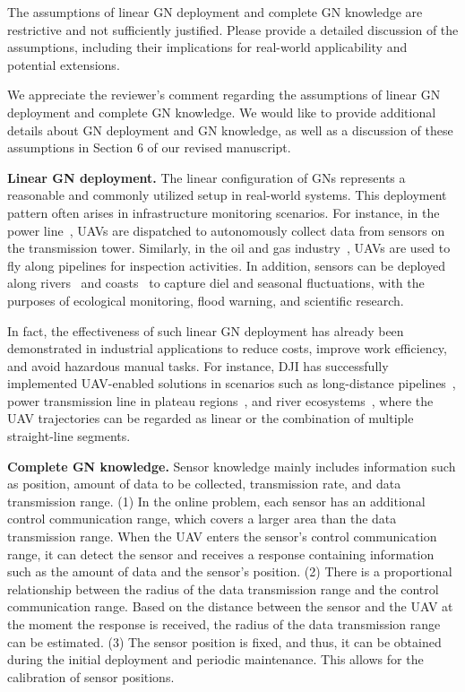 \begin{revcomment}
	The assumptions of linear GN deployment and complete GN knowledge are restrictive and not sufficiently justified. Please provide a detailed discussion of the assumptions, including their implications for real-world applicability and potential extensions.
\end{revcomment}
\begin{revresponse}
	We appreciate the reviewer's comment regarding the assumptions of linear GN deployment and complete GN knowledge.
	We would like to provide additional details about GN deployment and GN knowledge, as well as a discussion of these assumptions in Section 6 of our revised manuscript.

	\textbf{Linear GN deployment.}
	The linear configuration of GNs represents a reasonable and commonly utilized setup in real-world systems.
	This deployment pattern often arises in infrastructure monitoring scenarios.
	For instance, in the power line~\cite{powerline,transmission-line}, UAVs are dispatched to autonomously collect data from sensors on the transmission tower.
	Similarly, in the oil and gas industry~\cite{pipeline}, UAVs are used to fly along pipelines for inspection activities.
	In addition, sensors can be deployed along rivers~\cite{river} and coasts~\cite{coast} to capture diel and seasonal fluctuations, with the purposes of ecological monitoring, flood warning, and scientific research.

	In fact, the effectiveness of such linear GN deployment has already been demonstrated in industrial applications to reduce costs, improve work efficiency, and avoid hazardous manual tasks.
	For instance, DJI has successfully implemented UAV-enabled solutions in scenarios such as long-distance pipelines~\cite{DJI-pipeline}, power transmission line in plateau regions~\cite{DJI-powerline}, and river ecosystems~\cite{DJI-river}, where the UAV trajectories can be regarded as linear or the combination of multiple straight-line segments.

	\textbf{Complete GN knowledge.}
	Sensor knowledge mainly includes information such as position, amount of data to be collected, transmission rate, and data transmission range.
	(1) In the online problem, each sensor has an additional control communication range, which covers a larger area than the data transmission range.
	When the UAV enters the sensor's control communication range, it can detect the sensor and receives a response containing information such as the amount of data and the sensor's position.
	(2) There is a proportional relationship between the radius of the data transmission range and the control communication range.
	Based on the distance between the sensor and the UAV at the moment the response is received, the radius of the data transmission range can be estimated.
	(3) The sensor position is fixed, and thus, it can be obtained during the initial deployment and periodic maintenance. This allows for the calibration of sensor positions.


\end{revresponse}

